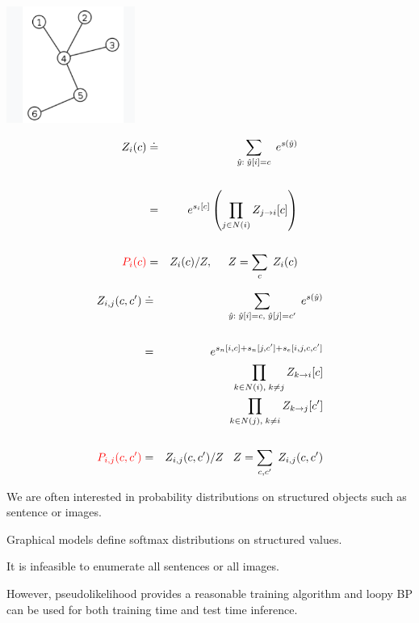 {

\centerline{\includegraphics[height=1.5in]{../images/Tree}}

\begin{eqnarray*}
Z_i(c) & \doteq & \sum_{\hat{y}:\; \hat{y}[i] = c} \;e^{s(\hat{y})} \\
\\
& = & e^{s_i[c]} \left(\prod_{j\in N(i)} Z_{j \rightarrow i}[c]\right) \\
\\
{\color{red} P_i(c)} & = & Z_i(c)/Z,\;\;\;\;\; Z = \sum_{c}\;Z_i(c)
\end{eqnarray*}



\begin{eqnarray*}
Z_{i,j}(c,c') & \doteq & \sum_{\hat{y}:\; \hat{y}[i] = c,\;\hat{y}[j] = c'} \;e^{s(\hat{y})} \\
\\
& = & e^{s_n[i,c] + s_n[j,c'] +s_e[i,j,c,c']} \\
& & \prod_{k\in N(i),\;k \not = j} Z_{k \rightarrow i}[c] \\
& & \prod_{k\in N(j),\;k \not = i} Z_{k \rightarrow j}[c'] \\
\\
{\color{red} P_{i,j}(c,c')} & = & Z_{i,j}(c,c')/Z\;\;\;Z = \sum_{c,c'}\;Z_{i,j}(c,c')
\end{eqnarray*}



We are often interested in probability distributions on structured objects such as sentence or images.

\vfill
Graphical models define softmax distributions on structured values.

\vfill
It is infeasible to enumerate all sentences or all images.

\vfill
However, pseudolikelihood provides a reasonable training algorithm and loopy BP can be used for both training time and test time
inference.


}


